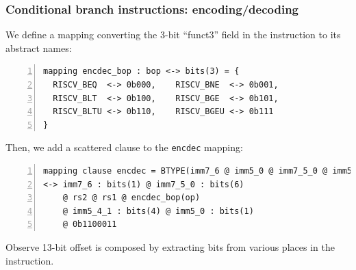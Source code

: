 \documentclass[aspectratio=169]{beamer}
\newcommand{\slidefont}{\scriptsize}
\newcommand{\cf}{\scriptsize\tt}
\begin{document}

\begin{frame}[fragile]
  \frametitle{Conditional branch instructions: encoding/decoding}

  \slidefont

  We define a mapping converting the 3-bit ``funct3'' field in the instruction to its abstract names:

  \vspace{1ex}

  \begin{Verbatim}[frame=single, numbers=left, label = File riscv\_types.sail]
mapping encdec_bop : bop <-> bits(3) = {
  RISCV_BEQ  <-> 0b000,    RISCV_BNE  <-> 0b001,
  RISCV_BLT  <-> 0b100,    RISCV_BGE  <-> 0b101,
  RISCV_BLTU <-> 0b110,    RISCV_BGEU <-> 0b111
}
  \end{Verbatim}

  Then, we add a scattered clause to the {\cf encdec} mapping:

  \vspace{1ex}

  \begin{Verbatim}[frame=single, numbers=left, label = File riscv\_types.sail]
mapping clause encdec = BTYPE(imm7_6 @ imm5_0 @ imm7_5_0 @ imm5_4_1 @ 0b0, rs2, rs1, op)
<-> imm7_6 : bits(1) @ imm7_5_0 : bits(6)
    @ rs2 @ rs1 @ encdec_bop(op)
    @ imm5_4_1 : bits(4) @ imm5_0 : bits(1)
    @ 0b1100011
  \end{Verbatim}

  \begin{minipage}{\textwidth}
    Observe 13-bit offset is composed by extracting bits from various places in the instruction.
  \end{minipage}

\end{frame}

\end{document}
